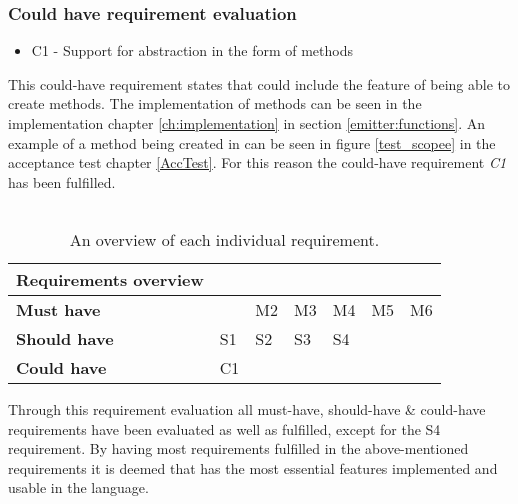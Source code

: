 \subsubsection{Could have requirement evaluation}
\begin{itemize}
    \item C1 - Support for abstraction in the form of methods
\end{itemize}
This could-have requirement states that \lang could include the feature of being able to create methods. The implementation of methods can be seen in the implementation chapter \ref{ch:implementation} in section \ref{emitter:functions}. An example of a method being created in \lang can be seen in figure \ref{test_scopee} in the acceptance test chapter \ref{AccTest}. For this reason the could-have requirement \textit{C1} has been fulfilled.
\\
\\
\begin{table}[H]
\centering
\begin{tabular}{|l|llllll}
\cline{1-1}
\textbf{Requirements overview} &                                                 &  &  &  &  &  \\ \hline
\textbf{Must have} &
  \multicolumn{1}{l|}{\cellcolor[HTML]{32CB00}{\color[HTML]{333333} M1}} &
  \multicolumn{1}{l|}{\cellcolor[HTML]{32CB00}M2} &
  \multicolumn{1}{l|}{\cellcolor[HTML]{32CB00}M3} &
  \multicolumn{1}{l|}{\cellcolor[HTML]{32CB00}M4} &
  \multicolumn{1}{l|}{\cellcolor[HTML]{32CB00}M5} &
  \multicolumn{1}{l|}{\cellcolor[HTML]{32CB00}M6} \\ \hline
\textbf{Should have} &
  \multicolumn{1}{l|}{\cellcolor[HTML]{32CB00}S1} &
  \multicolumn{1}{l|}{\cellcolor[HTML]{32CB00}S2} &
  \multicolumn{1}{l|}{\cellcolor[HTML]{32CB00}S3} &
  \multicolumn{1}{l|}{\cellcolor[HTML]{FFFF00}S4} &
   &
   \\ \cline{1-5}
\textbf{Could have}            & \multicolumn{1}{l|}{\cellcolor[HTML]{32CB00}C1} &  &  &  &  &  \\ \cline{1-2}

\end{tabular}
\caption{An overview of each individual requirement.}
\label{tab:reqfulfillmentoverview}
\end{table}
\noindent
Through this requirement evaluation all must-have, should-have \& could-have requirements have been evaluated as well as fulfilled, except for the S4 requirement. By having most requirements fulfilled in the above-mentioned requirements it is deemed that \lang has the most essential features implemented and usable in the language.
\\


